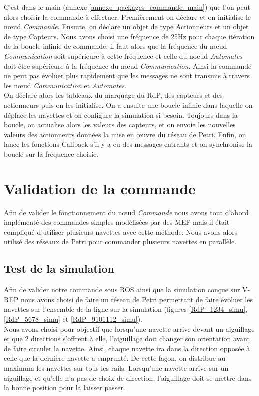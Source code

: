 \documentclass[a4paper,french, titlepage]{book}
\begin{document}
C'est dans le main (annexe \ref{annexe_packages_commande_main}) que l'on peut alors choisir la commande à effectuer. Premièrement on déclare et on initialise le nœud \emph{Commande}. Ensuite, on déclare un objet de type Actionneurs et un objet de type Capteurs. Nous avons choisi une fréquence de 25Hz pour chaque itération de la boucle infinie de commande, il faut alors que la fréquence du nœud \emph{Communication} soit supérieure à cette fréquence et celle du noeud \emph{Automates} doit être supérieure à la fréquence du nœud \emph{Communication}. Ainsi la commande ne peut pas évoluer plus rapidement que les messages ne sont transmis à travers les nœud \emph{Communication} et \emph{Automates}.\\

On déclare alors les tableaux du marquage du RdP, des capteurs et des actionneurs puis on les initialise. On a ensuite une boucle infinie dans laquelle on déplace les navettes et on configure la simulation si besoin. Toujours dans la boucle, on actualise alors les valeurs des capteurs, et on envoie les nouvelles valeurs des actionneurs données la mise en œuvre du réseau de Petri. Enfin, on lance les fonctions Callback s'il y a eu des messages entrants et on synchronise la boucle sur la fréquence choisie.


\newpage
\section{Validation de la commande \label{Validation_commande}}

Afin de valider le fonctionnement du nœud \emph{Commande} nous avons tout d'abord implémenté des commandes simples modélisées par des MEF mais il était compliqué d'utiliser plusieurs navettes avec cette méthode. Nous avons alors utilisé des réseaux de Petri pour commander plusieurs navettes en parallèle.

\subsection{Test de la simulation}

Afin de valider notre commande sous ROS ainsi que la simulation conçue sur V-REP nous avons choisi de faire un réseau de Petri permettant de faire évoluer les navettes sur l'ensemble de la ligne sur la simulation (figures \ref{RdP_1234_simu}, \ref{RdP_5678_simu} et \ref{RdP_9101112_simu}).\\

Nous avons choisi pour objectif que lorsqu'une navette arrive devant un aiguillage et que 2 directions s'offrent à elle, l'aiguillage doit changer son orientation avant de faire circuler la navette. Ainsi, chaque navette ira dans la direction opposée à celle que la dernière navette a emprunté. De cette façon, on distribue au maximum les navettes sur tous les rails. Lorsqu'une navette arrive sur un aiguillage et qu'elle n'a pas de choix de direction, l'aiguillage doit se mettre dans la bonne position pour la laisser passer.\\
\end{document}
